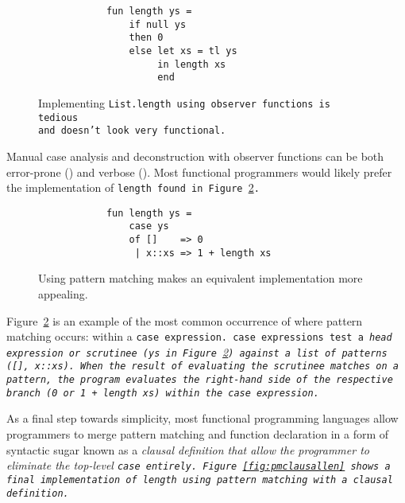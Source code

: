 \documentclass[manuscript,screen,review, 12pt]{acmart}
\begin{document}
    \begin{figure}[ht!]
        \smllst
        \captionsetup{justification=centering}
        \begin{verbatim}
            fun length ys =
                if null ys 
                then 0 
                else let xs = tl ys 
                     in length xs 
                     end 
        \end{verbatim}
    \caption{Implementing \tt{List.length} using observer functions is tedious\\\hspace{\textwidth}
    and doesn't look very functional.}
    \label{fig:observerlen}
    \end{figure}
    
    Manual case analysis and deconstruction with observer functions can be both
    error-prone () and verbose (). Most functional programmers would likely prefer the
    implementation of \tt{length} found in Figure~\ref{fig:pmlen}.
    \begin{figure}[htt]
    \begin{verbatim}
            fun length ys =
                case ys 
                of []    => 0
                 | x::xs => 1 + length xs
        \end{verbatim}

    \caption{Using pattern matching makes an equivalent implementation 
             more appealing.}

    \label{fig:pmlen}
    \end{figure}

    Figure~\ref{fig:pmlen} is an example of the most common occurrence of where
    pattern matching occurs: within a \tt{case} expression. \tt{case}
    expressions test a \it{head expression} or \it{scrutinee} (\tt{ys} in
    Figure~\ref{fig:pmlen}) against a list of patterns (\tt{[]}, \tt{x::xs}).
    When the result of evaluating the scrutinee matches on a pattern, the
    program evaluates the right-hand side of the respective branch (\tt{0} or
    \tt{1 + length xs}) within the \it{case} expression. 

    As a final step towards simplicity, most functional programming languages
    allow programmers to merge pattern matching and function declaration in a
    form of syntactic sugar known as a \it{clausal definition} that allow the
    programmer to eliminate the top-level \tt{case} entirely.
    Figure~\ref{fig:pmclausallen} shows a final implementation of \tt{length}
    using pattern matching with a clausal definition. 
\end{document}
